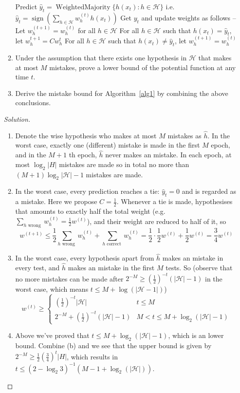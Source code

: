 \documentclass[12pt,letterpaper]{article}
\newenvironment{solution}{%
  \begin{proof}[Solution]$ $\par\nobreak\ignorespaces
}{%
  \end{proof}
}
\def \H{\mathcal H}
\DeclareMathOperator*{\sign}{sign}
\DeclareMathOperator*{\WM}{Weighted Majority}
\begin{document}
\begin{enumerate}
\begin{enumerate}[label=(\alph*)]
\begin{algorithm}[h]
\begin{algorithmic}[1]
       \State Predict $\hat y_t=\WM\{h(x_t): h\in\H\}$ i.e. $\hat y_t=\sign(\sum_{h\in\H}w_h^{(t)}h(x_t))$
       \State Get $y_t$ and update weights as follows -- 
       \State Let $w_h^{(t+1)}=w_h^{(t)}$ for all $h\in\H$
       \Else
       \State  For all $h\in\H $ such that $h(x_t)=\hat y_t$, let $w_h^{t+1}=C w_h^t$
       \State For all $h \in \H$ such that $h(x_t)\neq \hat y_t$,  let $w_h^{(t+1)}=w_h^{(t)}$ 
       \EndIf
    \EndFor
\end{algorithmic}
\end{algorithm}
    \item Under the assumption that there exists one hypothesis in $\H$ that makes at most $M$ mistakes, prove a lower bound of the potential function at any time $t$.
\item Derive the mistake bound for Algorithm~\ref{alg1} by combining the above conclusions.
\end{enumerate}

\begin{solution}

\begin{enumerate}[label=(\alph*)]
\item Denote the wise hypothesis who makes at most $M$ mistakes as $\hat h$. In the worst case, exactly one (different) mistake is made in the first $M$ epoch, and in the $M+1$ th epoch, $\hat h$ never makes an mistake. In each epoch, at most $\log_2|H|$ mistakes are made so in total no more than $(M+1)\log_2|\H|-1$ mistakes are made.

\item In the worst case, every prediction reaches a tie: $\hat y_t=0$ and is regarded as a mistake. Here we propose $C=\frac{1}{2}$. Whenever a tie is made, hypothesises that amounts to exactly half the total weight (e.g. $\sum\limits_{h \text{ wrong }}w_h^{(t)}=\frac{1}{2}w^{(t)}$), and their weight are reduced to half of it, so
\[w^{(t+1)}\leq\frac{1}{2}\sum_{h\text{ wrong }} w_h^{(t)}+\sum_{h\text{ correct }} w_h^{(t)}=\frac{1}{2}\cdot\frac{1}{2}w^{(t)}+\frac{1}{2}w^{(t)}=\frac{3}{4}w^{(t)}\] 
\item In the worst case, every hypothesis apart from $\hat h$ makes an mistake in every test, and $\hat h$ makes an mistake in the first $M$ tests. So (observe that no more mistakes can be made after $2^{-M}\geq (\frac{1}{2})^{-t}(|\H|-1)$ in the worst case, which means $t\leq M+\log(|\H-1|)$)
\[w^{(t)}\geq\begin{cases}
(\frac{1}{2})^{-t}|\H|& t\leq M\\
2^{-M}+(\frac{1}{2})^{-t}(|\H|-1) & M<t\leq M+\log_2(|\H|-1)
\end{cases}
\]
\item Above we've proved that $t\leq M+\log_2(|\H|-1)$, which is an lower bound. Combine (b) and we see that the upper bound is given by $2^{-M}\geq \frac{1}{2}(\frac{3}{4})^{t}|H|$, which results in $t\leq (2-\log_2 3)^{-1}(M-1+\log_2(|\H|))$.
\end{enumerate}
\end{solution}


\end{enumerate}
\end{document}
